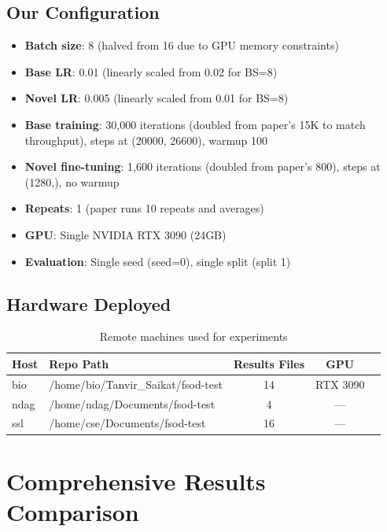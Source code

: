 \documentclass[11pt,a4paper]{article}
\begin{document}
\subsection{Our Configuration}
\begin{itemize}[nosep]
    \item \textbf{Batch size}: 8 (halved from 16 due to GPU memory constraints)
    \item \textbf{Base LR}: 0.01 (linearly scaled from 0.02 for BS=8)
    \item \textbf{Novel LR}: 0.005 (linearly scaled from 0.01 for BS=8)
    \item \textbf{Base training}: 30,000 iterations (doubled from paper's 15K to match throughput), steps at (20000, 26600), warmup 100
    \item \textbf{Novel fine-tuning}: 1,600 iterations (doubled from paper's 800), steps at (1280,), no warmup
    \item \textbf{Repeats}: 1 (paper runs 10 repeats and averages)
    \item \textbf{GPU}: Single NVIDIA RTX 3090 (24GB)
    \item \textbf{Evaluation}: Single seed (seed=0), single split (split 1)
\end{itemize}

\subsection{Hardware Deployed}
\begin{table}[h]
\centering
\caption{Remote machines used for experiments}
\begin{tabular}{llccc}
\toprule
Host & Repo Path & Results Files & GPU \\
\midrule
bio & /home/bio/Tanvir\_Saikat/fsod-test & 14 & RTX 3090 \\
ndag & /home/ndag/Documents/fsod-test & 4 & --- \\
ssl & /home/cse/Documents/fsod-test & 16 & --- \\
\bottomrule
\end{tabular}
\end{table}

\section{Comprehensive Results Comparison}
\end{document}

